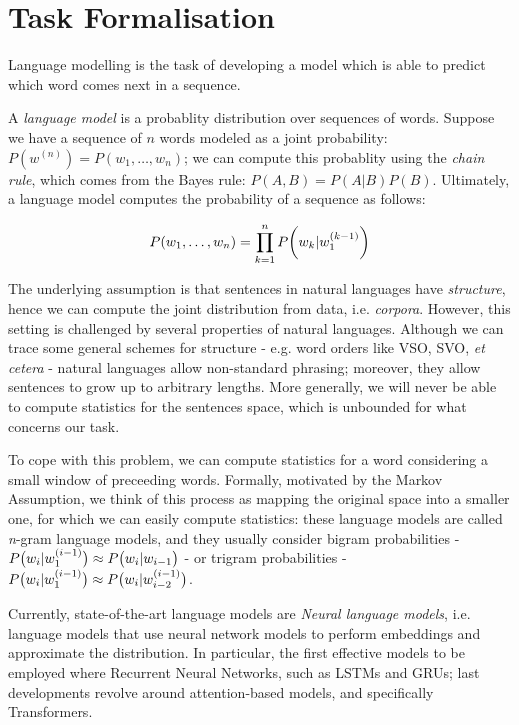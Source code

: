 \section{Task Formalisation}
Language modelling is the task of developing a model which is able to predict which word comes next in a sequence. 

A \emph{language model} is a probablity distribution over sequences of words. Suppose we have a sequence of \(n\) words modeled as a joint probability: \(P(w^{(n)}) = P(w_1, \ldots, w_n)\); we can compute this probablity using the \emph{chain rule}, which comes from the Bayes rule: \(P(A, B) = P(A|B)P(B)\). Ultimately, a language model computes the probability of a sequence as follows:

\begin{equation}
    P(w_1, \ldots, w_n)  = \prod_{k=1}^{n}P \parenth[\bigg]{w_k|w_1^{(k-1)}}
\end{equation}

The underlying assumption is that sentences in natural languages have \emph{structure}, hence we can compute the joint distribution from data, i.e. \emph{corpora}. However, this setting is challenged by several properties of natural languages. Although we can trace some general schemes for structure - e.g. word orders like VSO, SVO, \emph{et cetera} - natural languages allow non-standard phrasing; moreover, they allow sentences to grow up to arbitrary lengths. More generally, we will never be able to compute statistics for the sentences space, which is unbounded for what concerns our task.

To cope with this problem, we can compute statistics for a word considering a small window of preceeding words. Formally, motivated by the Markov Assumption, we think of this process as mapping the original space into a smaller one, for which we can easily compute statistics: these language models are called \emph{n}-gram language models, and they usually consider bigram probabilities - \(P \parenth[\big]{w_i | w_1^{(i-1)}} \approx P \parenth[\big]{w_i | w_{i-1}}\) - or trigram probabilities - \(P\parenth[\big]{w_i | w_1^{(i-1)}} \approx P \parenth[\big]{w_i | w_{i-2}^{(i-1)}}\).

Currently, state-of-the-art language models are \emph{Neural language models}, i.e. language models that use neural network models to perform embeddings and approximate the distribution. In particular, the first effective models to be employed where Recurrent Neural Networks, such as LSTMs and GRUs; last developments revolve around attention-based models, and specifically Transformers. 
